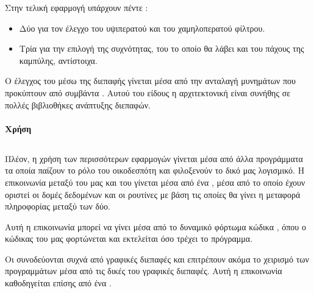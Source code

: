\documentclass[12pt]{extarticle}
\begin{document}
Στην τελική εφαρμογή υπάρχουν πέντε :

\begin{itemize}
    \item Δύο για τον έλεγχο του υψιπερατού και του χαμηλοπερατού φίλτρου.
    \item Τρία για την επιλογή της  συχνότητας, του  το οποίο θα λάβει και του πάχους της καμπύλης, αντίστοιχα.
\end{itemize}

Ο έλεγχος του  μέσω της διεπαφής γίνεται μέσα από την ανταλαγή μυνημάτων 
που προκύπτουν από συμβάντα  \cite{EventsArchWiki}. Αυτού του είδους η αρχιτεκτονική 
είναι συνήθης σε πολλές βιβλιοθήκες ανάπτυξης διεπαφών.

\paragraph{Χρήση}

\subsection{}

Πλέον, η χρήση των περισσότερων εφαρμογών  γίνεται μέσα 
από άλλα προγράμματα τα οποία παίζουν το ρόλο του οικοδεσπότη 
και φιλοξενούν το δικό μας λογισμικό. Η επικοινωνία μεταξύ 
του  μας και του  γίνεται μέσα από 
ένα , μέσα από το οποίο έχουν οριστεί οι δομές δεδομένων 
και οι ρουτίνες με βάση τις οποίες θα γίνει η μεταφορά πληροφορίας 
μεταξύ των δύο. 


Αυτή η επικοινωνία μπορεί να γίνει μέσα από το δυναμικό 
φόρτωμα κώδικα \cite{DynamicLoadWiki}, όπου 
ο κώδικας του  μας φορτώνεται και εκτελείται όσο τρέχει
το  πρόγραμμα. \cite{DesignPlugins}

Οι  συνοδεύονται συχνά από γραφικές διεπαφές και επιτρέπουν ακόμα 
το χειρισμό των  προγραμμάτων μέσα από τις δικές του γραφικές 
διεπαφές. Αυτή η επικοινωνία καθοδηγείται επίσης από ένα . 
\end{document}
